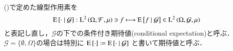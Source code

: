 	\begin{screen}
		\begin{dfn}
			()で定めた線型作用素を
			\begin{align}
				\operatorname{E} \left[ \cdot \ \middle|\ \mathcal{G} \right]:\operatorname{L}^{2} \left(\Omega, \mathcal{F},\mu\right) \ni f \longmapsto \operatorname{E} \left[ f \ \middle|\ \mathcal{G} \right] \in \operatorname{L}^{2} \left(\Omega, \mathcal{G},\mu\right)
				\label{eq:dfn_L2_conditional_expectation}
			\end{align}
			と表記し直し，$\mathcal{G}$の下での条件付き期待値(conditional expectation)と呼ぶ．
			$\mathcal{G} = \{\emptyset, \Omega\}$の場合は特別に
			$\operatorname{E} \left[ \cdot \right] \coloneqq \operatorname{E} \left[ \cdot \ \middle|\ \mathcal{G} \right]$
			と書いて期待値と呼ぶ．
		\end{dfn}
	\end{screen}
	
